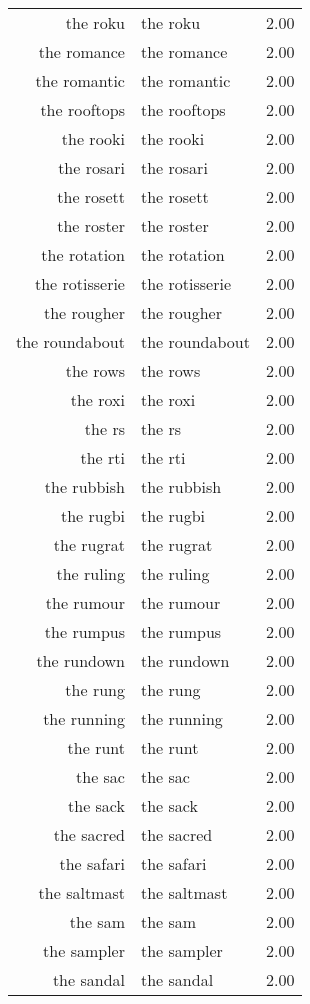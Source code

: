 \begin{table}[ht]
\begin{tabular}{rlr}
  the roku & the roku & 2.00 \\ 
  the romance & the romance & 2.00 \\ 
  the romantic & the romantic & 2.00 \\ 
  the rooftops & the rooftops & 2.00 \\ 
  the rooki & the rooki & 2.00 \\ 
  the rosari & the rosari & 2.00 \\ 
  the rosett & the rosett & 2.00 \\ 
  the roster & the roster & 2.00 \\ 
  the rotation & the rotation & 2.00 \\ 
  the rotisserie & the rotisserie & 2.00 \\ 
  the rougher & the rougher & 2.00 \\ 
  the roundabout & the roundabout & 2.00 \\ 
  the rows & the rows & 2.00 \\ 
  the roxi & the roxi & 2.00 \\ 
  the rs & the rs & 2.00 \\ 
  the rti & the rti & 2.00 \\ 
  the rubbish & the rubbish & 2.00 \\ 
  the rugbi & the rugbi & 2.00 \\ 
  the rugrat & the rugrat & 2.00 \\ 
  the ruling & the ruling & 2.00 \\ 
  the rumour & the rumour & 2.00 \\ 
  the rumpus & the rumpus & 2.00 \\ 
  the rundown & the rundown & 2.00 \\ 
  the rung & the rung & 2.00 \\ 
  the running & the running & 2.00 \\ 
  the runt & the runt & 2.00 \\ 
  the sac & the sac & 2.00 \\ 
  the sack & the sack & 2.00 \\ 
  the sacred & the sacred & 2.00 \\ 
  the safari & the safari & 2.00 \\ 
  the saltmast & the saltmast & 2.00 \\ 
  the sam & the sam & 2.00 \\ 
  the sampler & the sampler & 2.00 \\ 
  the sandal & the sandal & 2.00 \\ 

\end{tabular}
\end{table}
